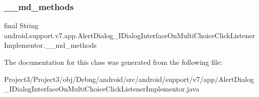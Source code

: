 \subsubsection{\texorpdfstring{\+\_\+\+\_\+md\+\_\+methods}{\_\_md\_methods}}
{\footnotesize\ttfamily final String android.\+support.\+v7.\+app.\+Alert\+Dialog\+\_\+\+I\+Dialog\+Interface\+On\+Multi\+Choice\+Click\+Listener\+Implementor.\+\_\+\+\_\+md\+\_\+methods\hspace{0.3cm}{\ttfamily [static]}}



The documentation for this class was generated from the following file\+:\begin{DoxyCompactItemize}
\item 
Project3/\+Project3/obj/\+Debug/android/src/android/support/v7/app/Alert\+Dialog\+\_\+\+I\+Dialog\+Interface\+On\+Multi\+Choice\+Click\+Listener\+Implementor.\+java\end{DoxyCompactItemize}
